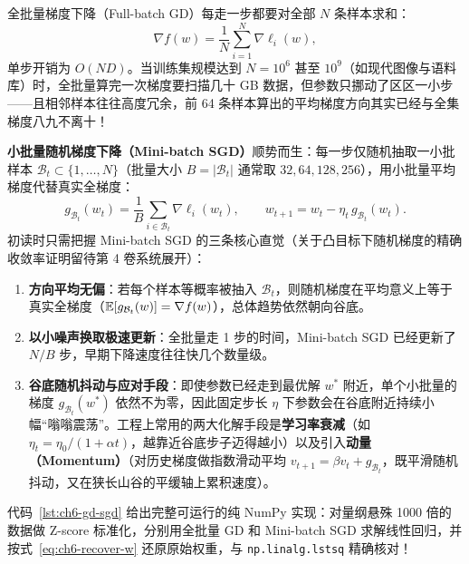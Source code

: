 全批量梯度下降（Full-batch GD）每走一步都要对全部 $N$ 条样本求和：
\[
  \nabla f(w) = \frac{1}{N} \sum_{i=1}^N \nabla \ell_i(w),
\]
单步开销为 $O(ND)$。当训练集规模达到 $N = 10^6$ 甚至 $10^9$（如现代图像与语料库）时，全批量算完一次梯度要扫描几十 GB 数据，但参数只挪动了区区一小步——且相邻样本往往高度冗余，前 64 条样本算出的平均梯度方向其实已经与全集梯度八九不离十！

\textbf{小批量随机梯度下降（Mini-batch SGD）}顺势而生：每一步仅随机抽取一小批样本 $\mathcal{B}_t \subset \{1,\dots,N\}$（批量大小 $B = |\mathcal{B}_t|$ 通常取 $32, 64, 128, 256$），用小批量平均梯度代替真实全梯度：
\begin{equation}\label{eq:ch6-sgd}
  g_{\mathcal{B}_t}(w_t) = \frac{1}{B} \sum_{i\in\mathcal{B}_t} \nabla \ell_i(w_t),
  \qquad
  w_{t+1} = w_t - \eta_t\, g_{\mathcal{B}_t}(w_t).
\end{equation}
初读时只需把握 Mini-batch SGD 的三条核心直觉（关于凸目标下随机梯度的精确收敛率证明留待第 4 卷系统展开）：
\begin{enumerate}
  \item \textbf{方向平均无偏}：若每个样本等概率被抽入 $\mathcal{B}_t$，则随机梯度在平均意义上等于真实全梯度（$\mathbb{E}[g_{\mathcal{B}_t}(w)] = \nabla f(w)$），总体趋势依然朝向谷底。
  \item \textbf{以小噪声换取极速更新}：全批量走 1 步的时间，Mini-batch SGD 已经更新了 $N/B$ 步，早期下降速度往往快几个数量级。
  \item \textbf{谷底随机抖动与应对手段}：即使参数已经走到最优解 $w^*$ 附近，单个小批量的梯度 $g_{\mathcal{B}_t}(w^*)$ 依然不为零，因此固定步长 $\eta$ 下参数会在谷底附近持续小幅“嗡嗡震荡”。工程上常用的两大化解手段是\textbf{学习率衰减}（如 $\eta_t = \eta_0 / (1 + \alpha t)$，越靠近谷底步子迈得越小）以及引入\textbf{动量（Momentum）}（对历史梯度做指数滑动平均 $v_{t+1} = \beta v_t + g_{\mathcal{B}_t}$，既平滑随机抖动，又在狭长山谷的平缓轴上累积速度）。
\end{enumerate}

代码~\ref{lst:ch6-gd-sgd} 给出完整可运行的纯 NumPy 实现：对量纲悬殊 1000 倍的数据做 Z-score 标准化，分别用全批量 GD 和 Mini-batch SGD 求解线性回归，并按式~\eqref{eq:ch6-recover-w} 还原原始权重，与 \texttt{np.linalg.lstsq} 精确核对！

